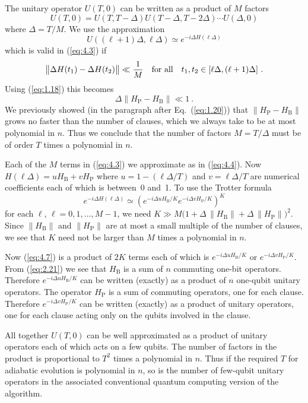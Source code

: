 \documentclass[twoside]{article}
\newcommand{\numEq}[2]{\begin{equation}
   \label{eq:#1}
   #2\end{equation}}
\newcommand{\refEq}[1]{(\ref{eq:#1})}
\newcommand{\rP}{{\mathrm{P}}}
\newcommand{\rB}{{\mathrm{B}}}
\numberwithin{equation}{section}
\begin{document}
The unitary operator $U(T,0)$ can be written as a product of $M$ factors
\numEq{4.3}{ U(T,0) = U(T,T-\Delta ) U(T-\Delta, T-2\Delta )\cdots
U(\Delta,0 ) } where $\Delta=T/M$.  We use the approximation
\numEq{4.4}{ U((\ell+1)\Delta, \ell \Delta ) \simeq e^{-i\Delta H(\ell\Delta)}
} which is valid in \refEq{4.3} if
\numEq{4.5}{
\bigl\|  \Delta H (t_1) - \Delta H (t_2) \bigr\|  \ll \frac{1}{M} \quad
\hbox{for all}
\quad t_1,t_2 \in  [\ell \Delta, (\ell+1) \Delta] \ . } Using \refEq{1.18} this
becomes
\numEq{4.6}{
\Delta \bigl\|  H_\rP - H_\rB \bigr\| \ll 1 \ . } We previously showed (in
the paragraph after Eq.~\refEq{1.20}) that $\|  H_\rP - H_\rB \|$ grows no
faster than the number of clauses, which we always take to be at most
polynomial in $n$.  Thus we conclude that the number of factors 
$M=T/\Delta$ must be of order $T$ times a polynomial in $n$.

Each of the $M$ terms in \refEq{4.3} we approximate as in \refEq{4.4}. 
Now
$H(\ell \Delta)=uH_\rB + vH_\rP$ where $u=1-({\ell\Delta}/{T})$ and
$v= \ell \Delta/T$ are numerical coefficients each of which is between~0
and~1.   To use the Trotter formula
\numEq{4.7}{ e^{-i\Delta H(\ell \Delta)} \simeq (e^{-i\Delta
uH_\rB/K}e^{-i\Delta vH_\rP/K} )^K } for each $\ell$, $\ell=0,1,\dots,M-1$, 
we need $K\gg M \big(1+\Delta\,\|H_\rB\| + \Delta\, \|H_\rP\|\big)^2$. 
Since $\|H_\rB\| $ and 
$\|H_\rP\|$ are at most a small multiple of the number of clauses, we see
that
$K$ need not be larger than $M$ times a polynomial in $n$.

Now \refEq{4.7} is a product of $2K$ terms each of which is $e^{-i\Delta
uH_\rB/K}$ or $e^{-i\Delta vH_\rP/K}$.  From \refEq{2.21} we see that
$H_\rB$ is a sum of $n$ commuting one-bit operators.  Therefore
$e^{-i\Delta uH_\rB/K}$ can be written (exactly) as a product of $n$
one-qubit unitary operators.  The operator $H_\rP$ is a sum of commuting
operators, one for each clause.  Therefore $e^{-i\Delta vH_\rP/K}$ can be
written (exactly) as a product of unitary operators, one for each clause
acting only on the qubits involved in the clause.

All together $U(T,0)$ can be well approximated as a product of unitary
operators each of which acts on a few qubits.  The number of factors in the
product is proportional to $T^2$ times a polynomial in $n$.  Thus if the
required $T$ for adiabatic evolution is polynomial in $n$, so is the number
of few-qubit unitary operators in the associated conventional quantum
computing version of the algorithm.
\end{document}
